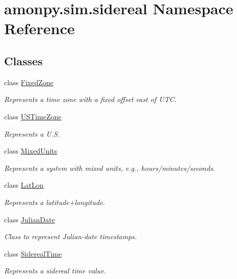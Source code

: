 \hypertarget{namespaceamonpy_1_1sim_1_1sidereal}{\section{amonpy.\-sim.\-sidereal Namespace Reference}
\label{namespaceamonpy_1_1sim_1_1sidereal}
}
\subsection*{Classes}
\begin{DoxyCompactItemize}
\item 
class \hyperlink{classamonpy_1_1sim_1_1sidereal_1_1_fixed_zone}{Fixed\-Zone}
\begin{DoxyCompactList}\small\item\em Represents a time zone with a fixed offset east of U\-T\-C. \end{DoxyCompactList}\item 
class \hyperlink{classamonpy_1_1sim_1_1sidereal_1_1_u_s_time_zone}{U\-S\-Time\-Zone}
\begin{DoxyCompactList}\small\item\em Represents a U.\-S. \end{DoxyCompactList}\item 
class \hyperlink{classamonpy_1_1sim_1_1sidereal_1_1_mixed_units}{Mixed\-Units}
\begin{DoxyCompactList}\small\item\em Represents a system with mixed units, e.\-g., hours/minutes/seconds. \end{DoxyCompactList}\item 
class \hyperlink{classamonpy_1_1sim_1_1sidereal_1_1_lat_lon}{Lat\-Lon}
\begin{DoxyCompactList}\small\item\em Represents a latitude+longitude. \end{DoxyCompactList}\item 
class \hyperlink{classamonpy_1_1sim_1_1sidereal_1_1_julian_date}{Julian\-Date}
\begin{DoxyCompactList}\small\item\em Class to represent Julian-\/date timestamps. \end{DoxyCompactList}\item 
class \hyperlink{classamonpy_1_1sim_1_1sidereal_1_1_sidereal_time}{Sidereal\-Time}
\begin{DoxyCompactList}\small\item\em Represents a sidereal time value. \end{DoxyCompactList}\item 

\end{DoxyCompactItemize}
